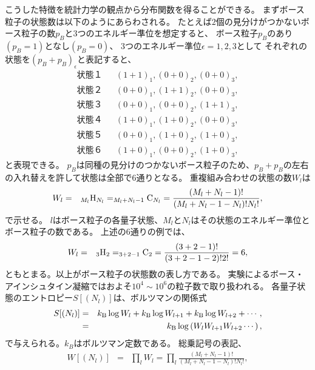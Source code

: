 \documentclass[12pt,a4paper]{jbook}
\newcommand{\kb} {k_{\rm B}}				%
\begin{document}
        こうした特徴を統計力学の観点から分布関数を得ることができる。
        まずボース粒子の状態数は以下のようにあらわされる。
        たとえば$2$個の見分けがつかないボース粒子の数$p_B$と$3$つのエネルギー準位を想定すると、
        ボース粒子$p_B$のあり$(p_B=1)$となし$(p_B=0)$、
        $3$つのエネルギー準位$\epsilon = 1, 2, 3$として
        それぞれの状態を$(p_B+p_B)_\epsilon$と表記すると、
        \begin{eqnarray*}
            状態１ & & (1+1)_1, (0+0)_2, (0+0)_3, 
            \\
            状態２ & & (0+0)_1, (1+1)_2, (0+0)_3, 
            \\
            状態３ & & (0+0)_1, (0+0)_2, (1+1)_3, 
            \\
            状態４ & & (1+0)_1, (1+0)_2, (0+0)_3, 
            \\
            状態５ & & (0+0)_1, (1+0)_2, (1+0)_3,
            \\
            状態６ & & (1+0)_1, (0+0)_2, (1+0)_3,
        \end{eqnarray*}
        と表現できる。
        $p_B$は同種の見分けのつかないボース粒子のため、$p_B+p_B$の左右の入れ替えを許して状態は全部で6通りとなる。
        重複組み合わせの状態の数$W_l$は
		\begin{eqnarray}
			W_l & = & _{M_l} {\rm H}_{N_l} = _{M_l + N_l - 1} {\rm C}_{N_l}
			=  \frac{(M_l+N_l-1)!}{(M_l+N_l-1-N_l)!N_l!},
		\end{eqnarray}
        で示せる。
        $l$はボース粒子の各量子状態、$M_l$と$N_l$はその状態のエネルギー準位とボース粒子の数である。
        上述の$6$通りの例では、
        \begin{eqnarray}
            W_l & = & _{3} {\rm H}_{2} = _{3 + 2 - 1} {\rm C}_{2} = \frac{(3+2-1)!}{(3+2-1-2)!2!} = 6,
        \end{eqnarray}
        ともとまる。以上がボース粒子の状態数の表し方である。
        実験によるボース・アインシュタイン凝縮ではおよそ$10^4 \sim 10^6$の粒子数で取り扱われる。
		各量子状態のエントロピー$S[(N_l)]$は、ボルツマンの関係式
		\begin{eqnarray}
			S[(N_l)] & = & \kb \log W_l + \kb \log W_{l+1} +\kb \log W_{l+2} + \cdots, \nonumber
            \\
            & = & \kb \log \left( W_l W_{l+1} W_{l+2} \cdots \right),
		\end{eqnarray}
        で与えられる。$k_{B}$はボルツマン定数である。
		総乗記号の表記、
		\begin{eqnarray}
			W[(N_l)] & = & \prod_l W_l = \prod_l \frac{(M_l+N_l-1)!}{(M_l+N_l-1-N_l)!N_l!},
		\end{eqnarray}
\end{document}
